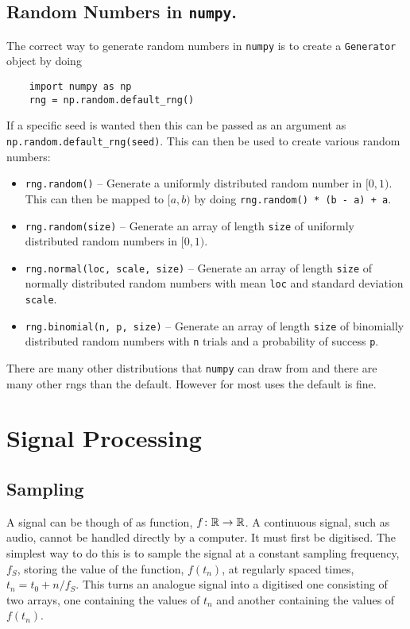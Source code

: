 \documentclass[a4paper]{article}
\begin{document}
    \subsection{Random Numbers in \texorpdfstring{\lstinline|numpy|}{numpy}.}
    The correct way to generate random numbers in \lstinline|numpy| is to create a \lstinline|Generator| object by doing
    \begin{lstlisting}
    import numpy as np
    rng = np.random.default_rng()
    \end{lstlisting}
    If a specific seed is wanted then this can be passed as an argument as \lstinline|np.random.default_rng(seed)|.
    This can then be used to create various random numbers:
    \begin{itemize}
        \item \lstinline|rng.random()|  -- Generate a uniformly distributed random number in \([0, 1)\).
        This can then be mapped to \([a, b)\) by doing \lstinline|rng.random() * (b - a) + a|.
        \item \lstinline|rng.random(size)| -- Generate an array of length \lstinline|size| of uniformly distributed random numbers in \([0, 1)\).
        \item \lstinline|rng.normal(loc, scale, size)| -- Generate an array of length \lstinline|size| of normally distributed random numbers with mean \lstinline|loc| and standard deviation \lstinline|scale|.
        \item \lstinline|rng.binomial(n, p, size)| -- Generate an array of length \lstinline|size| of binomially distributed random numbers with \lstinline|n| trials and a probability of success \lstinline|p|.
    \end{itemize}
    There are many other distributions that \lstinline|numpy| can draw from and there are many other \glspl{rng} than the default.
    However for most uses the default is fine.
    
    \section{Signal Processing}
    \subsection{Sampling}
    A signal can be though of as function, \(f\colon\mathbb{R}\to\mathbb{R}\).
    A continuous signal, such as audio, cannot be handled directly by a computer.
    It must first be digitised.
    The simplest way to do this is to sample the signal at a constant sampling frequency, \(f_S\), storing the value of the function, \(f(t_n)\), at regularly spaced times, \(t_n = t_0 + n/f_S\).
    This turns an analogue signal into a digitised one consisting of two arrays, one containing the values of \(t_n\) and another containing the values of \(f(t_n)\).
    
\end{document}
